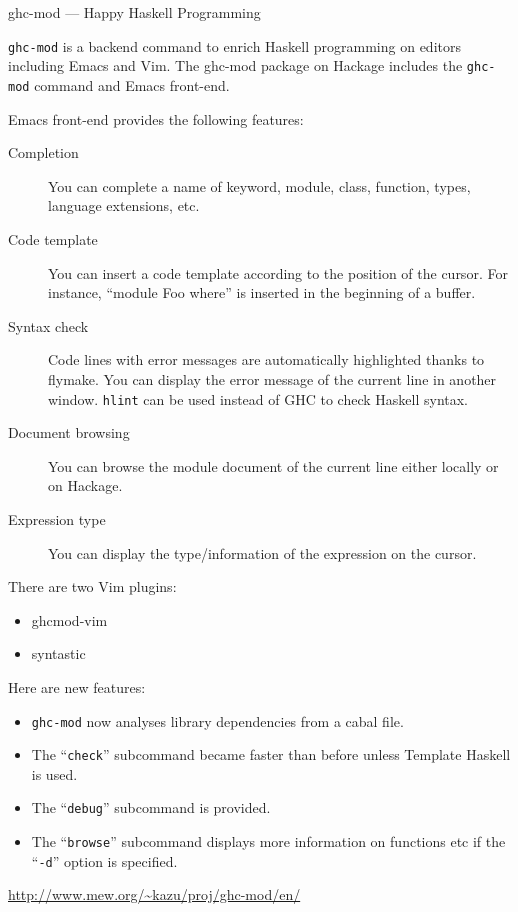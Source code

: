 \begin{hcarentry}[updated]{ghc-mod --- Happy Haskell Programming}
\makeheader

{\tt ghc-mod} is a backend command to enrich Haskell programming on editors including Emacs and Vim. The ghc-mod package on Hackage includes the {\tt ghc-mod} command and Emacs front-end. 

Emacs front-end provides the following features:

\begin{description}
\item[Completion] You can complete a name of keyword, module, class, function, types, language extensions, etc.

\item[Code template] You can insert a code template according to the position of the cursor. For instance, ``module Foo where'' is inserted in the beginning of a buffer.

\item[Syntax check] Code lines with error messages are automatically highlighted thanks to flymake. You can display the error message of the current line in another window. {\tt hlint} %
can be used instead of GHC to check Haskell syntax. 

\item[Document browsing] You can browse the module document of the current line either locally or on Hackage.

\item[Expression type] You can display the type/information of the expression on the cursor. 
\end{description}

There are two Vim plugins:

\begin{itemize}
\item ghcmod-vim
\item syntastic
\end{itemize}

Here are new features:

\begin{itemize}
\item {\tt ghc-mod} now analyses library dependencies from a cabal file.
\item The ``{\tt check}'' subcommand became faster than before unless Template Haskell is used. 
\item The ``{\tt debug}'' subcommand is provided.
\item The ``{\tt browse}'' subcommand displays more information on functions etc if the ``{\tt -d}'' option is specified.
\end{itemize}

\FurtherReading
  \url{http://www.mew.org/~kazu/proj/ghc-mod/en/}
\end{hcarentry}
